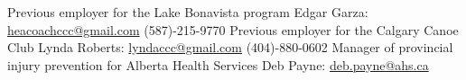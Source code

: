 \begin{cventries}
	\cventry
	{Previous employer for the Lake Bonavista program}
	{Edgar Garza:}
	{{\href{mailto:headcoachccc@gmail.com}{heacoachccc@gmail.com}}}
	{{(587)-215-9770} }
	{}
	\cventry
	{Previous employer for the Calgary Canoe Club}
	{Lynda Roberts:}
	{{\href{mailto:lyndaccc@gmail.com}{lyndaccc@gmail.com}}}
	{{(404)-880-0602 }}
	{}
	\cventry
	{Manager of provincial injury prevention for Alberta Health Services}
	{Deb Payne:} 
	{\href{mailto:deb.payne@ahs.ca}{deb.payne@ahs.ca}}
	{}
	{}
\end{cventries}
